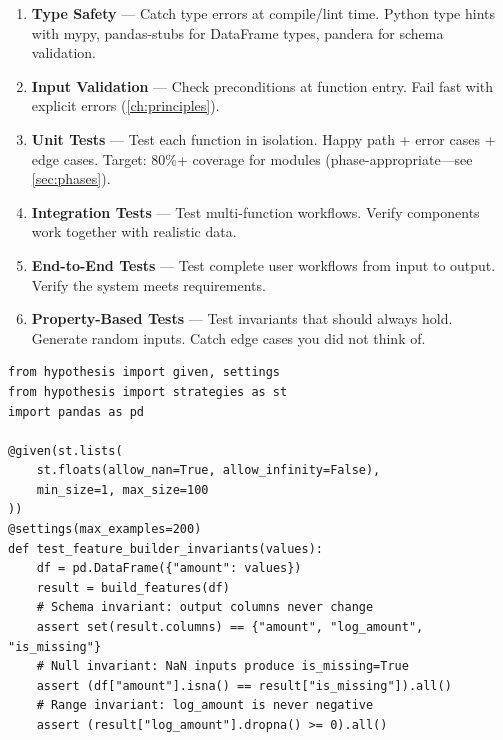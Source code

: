 \begin{enumerate}
  \item \textbf{Type Safety} --- Catch type errors at compile/lint time.
    Python type hints with mypy, pandas-stubs for DataFrame types, pandera for schema validation.

  \item \textbf{Input Validation} --- Check preconditions at function entry.
    Fail fast with explicit errors (\cref{ch:principles}).

  \item \textbf{Unit Tests} --- Test each function in isolation.
    Happy path + error cases + edge cases.
    Target: 80\%+ coverage for modules (phase-appropriate---see \cref{sec:phases}).

  \item \textbf{Integration Tests} --- Test multi-function workflows.
    Verify components work together with realistic data.

  \item \textbf{End-to-End Tests} --- Test complete user workflows
    from input to output. Verify the system meets requirements.

  \item \textbf{Property-Based Tests} --- Test invariants that should always hold.
    Generate random inputs. Catch edge cases you did not think of.
\end{enumerate}


\begin{verbatim}
from hypothesis import given, settings
from hypothesis import strategies as st
import pandas as pd

@given(st.lists(
    st.floats(allow_nan=True, allow_infinity=False),
    min_size=1, max_size=100
))
@settings(max_examples=200)
def test_feature_builder_invariants(values):
    df = pd.DataFrame({"amount": values})
    result = build_features(df)
    # Schema invariant: output columns never change
    assert set(result.columns) == {"amount", "log_amount", "is_missing"}
    # Null invariant: NaN inputs produce is_missing=True
    assert (df["amount"].isna() == result["is_missing"]).all()
    # Range invariant: log_amount is never negative
    assert (result["log_amount"].dropna() >= 0).all()
\end{verbatim}

